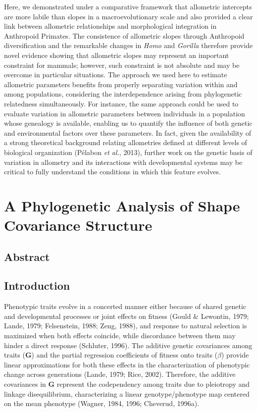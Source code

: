 \documentclass[12pt,twoside]{report}
\begin{document}
Here, we demonstrated under a comparative framework that allometric
intercepts are more labile than slopes in a macroevolutionary scale and
also provided a clear link between allometric relationships and
morphological integration in Anthropoid Primates. The consistence of
allometric slopes through Anthropoid diversification and the remarkable
changes in \emph{Homo} and \emph{Gorilla} therefore provide novel
evidence showing that allometric slopes may represent an important
constraint for mammals; however, such constraint is not absolute and may
be overcome in particular situations. The approach we used here to
estimate allometric parameters benefits from properly separating
variation within and among populations, considering the interdependence
arising from phylogenetic relatedness simultaneously. For instance, the
same approach could be used to evaluate variation in allometric
parameters between individuals in a population whose genealogy is
available, enabling us to quantify the influence of both genetic and
environmental factors over these parameters. In fact, given the
availability of a strong theoretical background relating allometries
defined at different levels of biological organization (Pélabon \emph{et
al.}, 2013), further work on the genetic basis of variation in allometry
and its interactions with developmental systems may be critical to fully
understand the conditions in which this feature evolves.

\newpage
\chapter{A Phylogenetic Analysis of Shape Covariance Structure}
\label{ch:ppca}

\section{Abstract}\label{abstract-2}

\section{Introduction}\label{introduction-2}

Phenotypic traits evolve in a concerted manner either because of shared
genetic and developmental processes or joint effects on fitness (Gould
\& Lewontin, 1979; Lande, 1979; Felsenstein, 1988; Zeng, 1988), and
response to natural selection is maximized when both effects coincide,
while discordance between them may hinder a direct response (Schluter,
1996). The additive genetic covariances among traits ($\mathbf{G}$) and
the partial regression coefficients of fitness onto traits ($\beta$)
provide linear approximations for both these effects in the
characterization of phenotypic change across generations (Lande, 1979;
Rice, 2002). Therefore, the additive covariances in $\mathbf{G}$
represent the codependency among traits due to pleiotropy and linkage
disequilibrium, characterizing a linear genotype/phenotype map centered
on the mean phenotype (Wagner, 1984, 1996; Cheverud, 1996a).
\end{document}
